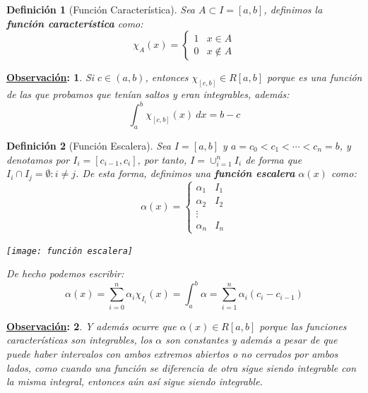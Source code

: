 \documentclass[10pt,a4paper,openright]{book}
\theoremstyle{break}
\newtheorem*{defi}{Definición}
\newtheorem*{obs}{\underline{Observación}:}
\newcommand{\dif}[1]{\ d#1}
\begin{document}
\begin{defi}[Función Característica]
Sea $A\subset I=[a,b]$, definimos la \textbf{función característica} como:
$$\chi_A(x)=\begin{cases}1 & x\in A \\ 0 & x\notin A\end{cases}$$
\end{defi}

\begin{obs}
Si $c\in (a,b)$, entonces $\chi_{[c,b]}\in R[a,b]$ porque es una función de las que probamos que tenían saltos y eran integrables, además:
$$\int_{a}^{b}\chi_{[c,b]}(x)\dif{x}=b-c$$
\end{obs}

\begin{defi}[Función Escalera]
Sea $I=[a,b]$ y $a=c_0< c_1 <\cdots < c_n=b$, y denotamos por $I_i=[c_{i-1},c_i]$, por tanto, $I=\cup_{i=1}^n I_i$ de forma que $I_i\cap I_j = \emptyset : i\neq j$. De esta forma, definimos una \textbf{función escalera} $\alpha(x)$ como:
$$\alpha(x)=\begin{cases} \alpha_1 & I_1 \\ \alpha_2 & I_2 \\ \vdots \\ \alpha_n & I_n \end{cases}$$
\begin{center}
\texttt{[image: función escalera]}
\end{center}
De hecho podemos escribir:
$$\alpha(x)=\sum_{i=0}^{n}\alpha_i\chi_{I_i}(x) = \int_{a}^{b}\alpha = \sum_{i=1}^{n}\alpha_i (c_i-c_{i-1})$$
\end{defi}

\begin{obs}
Y además ocurre que $\alpha(x)\in R[a,b]$ porque las funciones características son integrables, los $\alpha$ son constantes y además a pesar de que puede haber intervalos con ambos extremos abiertos o no cerrados por ambos lados, como cuando una función se diferencia de otra sigue siendo integrable con la misma integral, entonces aún así sigue siendo integrable.
\end{obs}
\end{document}
